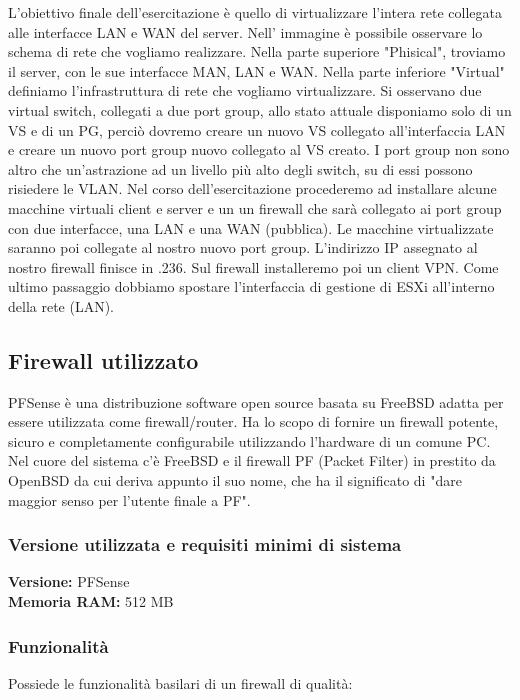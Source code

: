 \documentclass{article}
\begin{document}
\noindent 
L'obiettivo finale dell'esercitazione è quello di virtualizzare l'intera rete collegata alle interfacce LAN e WAN del server.
Nell' immagine è possibile osservare lo schema di rete che vogliamo realizzare.
Nella parte superiore "Phisical", troviamo il server, con le sue interfacce MAN, LAN e WAN.
Nella parte inferiore "Virtual" definiamo l'infrastruttura di rete che vogliamo virtualizzare. Si osservano due virtual switch, collegati a due
port group, allo stato attuale disponiamo solo di un VS e di un PG, perciò dovremo creare un nuovo VS
collegato all'interfaccia LAN e creare un nuovo port group nuovo collegato al VS creato.
I port group non sono altro che un'astrazione ad un livello più alto degli switch,
su di essi possono risiedere le VLAN.
Nel corso dell'esercitazione procederemo ad installare alcune macchine virtuali client e server e un un firewall che sarà collegato ai port group con due interfacce, una LAN e una WAN (pubblica).
Le macchine virtualizzate saranno poi collegate al nostro nuovo port group. L'indirizzo IP assegnato al nostro firewall
finisce in .236. Sul firewall installeremo poi un client VPN.
Come ultimo passaggio dobbiamo spostare l’interfaccia di gestione di ESXi all’interno della rete (LAN).


\subsection{Firewall utilizzato}
PFSense è una distribuzione software open source basata su FreeBSD adatta per essere utilizzata come firewall/router. 
Ha lo scopo di fornire un firewall potente, sicuro e completamente configurabile utilizzando l'hardware di un comune PC. Nel cuore del sistema c'è FreeBSD e il firewall PF (Packet Filter) in prestito da OpenBSD da cui deriva appunto il suo nome, che ha il significato di "dare maggior senso per l'utente finale a PF".


\subsubsection{Versione utilizzata e requisiti minimi di sistema}
\textbf{Versione:} PFSense \\
\textbf{Memoria RAM:} 512 MB

\subsubsection{Funzionalità}
Possiede le funzionalità basilari di un firewall di qualità:
\end{document}
